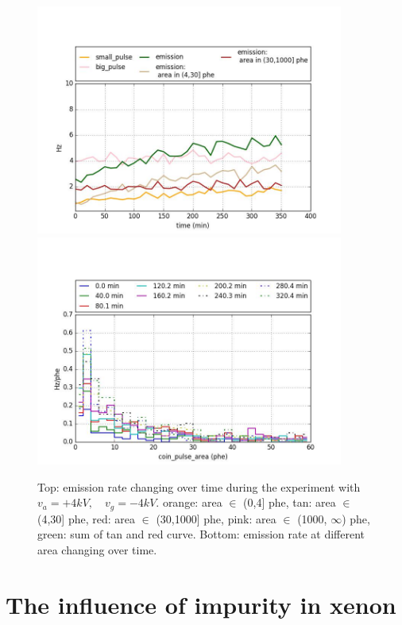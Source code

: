 \begin{figure}[!htbp]
  \centering
  \includegraphics[width=0.9\textwidth,clip,trim={0 0 0 170}]
  {Figures/Ch10/a4gn4_coin_pop_plot_important.jpg}
  \includegraphics[width=0.9\textwidth]
  {Figures/Ch10/a4gn4_hist_others_evolve_wavearea.jpg}
  \caption{Top: emission rate changing over time during the experiment with $v_a=+4kV, \quad v_g=-4 kV$. orange: area $\in$ (0,4] phe, tan: area $\in$ (4,30] phe, red: area $\in$ (30,1000] phe, pink: area $\in$ (1000, $\infty$) phe, green: sum of tan and red curve. Bottom: emission rate at different area changing over time.}
  \label{fig: Emission changing during the experiment}
\end{figure}





\section{The influence of impurity in xenon}

